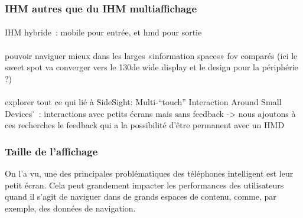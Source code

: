 

\subsubsection*{IHM autres que du IHM multiaffichage}
\paragraph*{}
IHM hybride~: mobile pour entrée, et hmd pour sortie \cite{LeeBudhirajaBillinghurst2013}

\paragraph*{}
pouvoir naviguer mieux dans les larges «information spaces» fov comparés \cite{RaedleJetterMuellerEtAl2014} (ici le sweet spot va converger vers le 130\textdegree de wide display et le design pour la périphérie ?)

\paragraph*{}
explorer tout ce qui lié à \"SideSight: Multi-“touch” Interaction Around Small Devices \"~: interactions avec petits écrans mais sans feedback -> nous ajoutons à ces recherches le feedback qui a la possibilité d'être permanent avec un HMD


\subsubsection*{Taille de l'affichage}
On l'a vu, une des principales problématiques des téléphones intelligent est leur petit écran. Cela peut grandement impacter les performances des utilisateurs quand il s'agit de naviguer dans de grands espaces de contenu, comme, par exemple, des données de navigation.

